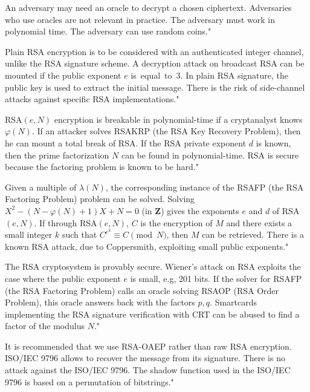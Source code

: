 {An adversary may need an oracle to decrypt a chosen ciphertext.}
{Adversaries who use oracles are not relevant in practice.}
{The adversary must work in polynomial time.}
{The adversary can use random coins."}

{Plain RSA encryption is to be considered with an authenticated integer channel, unlike the RSA signature scheme.}
{A decryption attack on broadcast RSA can be mounted if the public exponent $e$ is~equal~to~$3$.}
{In plain RSA signature, the public key is used to extract the initial message.}
{There is the risk of side-channel attacks against specific RSA implementations."}

{RSA$(e,N)$ encryption is breakable in polynomial-time if a cryptanalyst knows $\varphi(N)$.}
{If an attacker solves RSAKRP (the RSA Key Recovery Problem), then he can mount a total break of RSA.}
{If the RSA private exponent $d$ is known, then the prime factorization $N$ can be found in polynomial-time.}
{RSA is secure because the factoring problem is known to be hard."}

{Given a multiple of $\lambda(N)$, the corresponding instance of the RSAFP (the RSA Factoring Problem) problem can be solved.}
{Solving $X^2-(N-\varphi(N)+1)X+N=0$ (in $\mathbf{Z}$) gives the exponents $e$ and $d$ of RSA$(e,N)$.}
{If through RSA$(e,N)$, $C$ is the encryption of $M$ and there exists a small integer $k$ such that $C^{e^{k}} \equiv C \pmod{N}$, then $M$ can be retrieved.}
{There is a known RSA attack, due to Coppersmith, exploiting small public exponents."}

{The RSA cryptosystem is provably secure.}
{Wiener's attack on RSA exploits the case where the public exponent $e$ is small, e.g, 201 bits.}
{If the solver for RSAFP (the RSA Factoring Problem) calls an oracle solving RSAOP (RSA Order Problem), this oracle answers back with the factors $p, q$.}
{Smartcards implementing the RSA signature verification with CRT can be abused to find a factor of the modulus $N$."}

{It is recommended that we use RSA-OAEP rather than raw RSA encryption.}
{ISO/IEC 9796 allows to recover the message from its signature.}
{There is no attack against the ISO/IEC 9796.}
{The shadow function used in the ISO/IEC 9796 is based on a permutation of bitstrings."}

